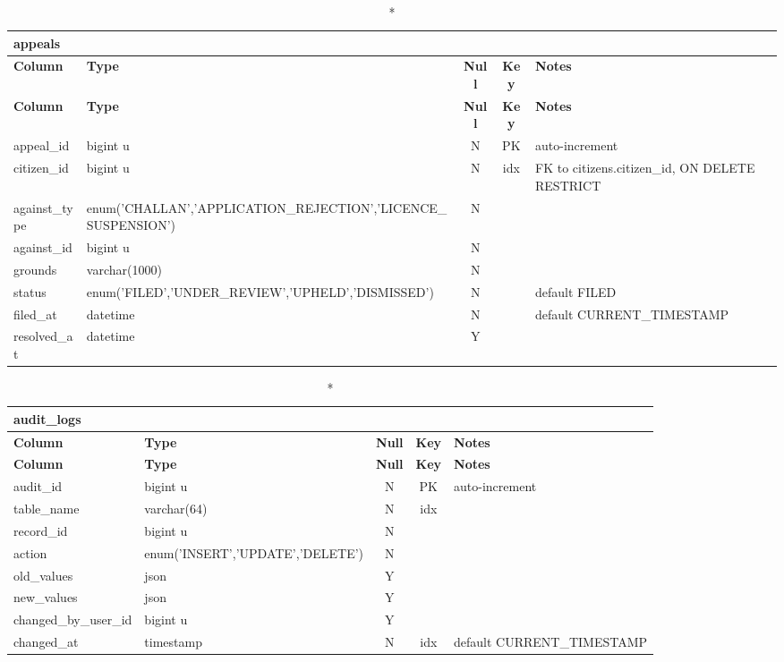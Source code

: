 \vspace{-0.4em}
\begin{longtable}{@{}p{3.4cm}p{2.9cm}c c p{5.6cm}@{}}
\caption*{\textbf{appeals}}\\
\toprule \textbf{Column} & \textbf{Type} & \textbf{Null} & \textbf{Key} & \textbf{Notes} \\ \midrule \endfirsthead
\toprule \textbf{Column} & \textbf{Type} & \textbf{Null} & \textbf{Key} & \textbf{Notes} \\ \midrule \endhead
\bottomrule \endlastfoot
appeal\_\allowbreak{}id & bigint u & N & PK & auto-increment \\
citizen\_\allowbreak{}id & bigint u & N & idx & FK to citizens.citizen\_\allowbreak{}id, ON DELETE RESTRICT \\
against\_\allowbreak{}type & enum('CHALLAN',\allowbreak{}'APPLICATION\_\allowbreak{}REJECTION',\allowbreak{}'LICENCE\_\allowbreak{}SUSPENSION') & N &  &  \\
against\_\allowbreak{}id & bigint u & N &  &  \\
grounds & varchar(1000) & N &  &  \\
status & enum('FILED',\allowbreak{}'UNDER\_\allowbreak{}REVIEW',\allowbreak{}'UPHELD',\allowbreak{}'DISMISSED') & N &  & default FILED \\
filed\_\allowbreak{}at & datetime & N &  & default CURRENT\_\allowbreak{}TIMESTAMP \\
resolved\_\allowbreak{}at & datetime & Y &  &  \\
\end{longtable}
\vspace{-0.4em}
\begin{longtable}{@{}p{3.4cm}p{2.9cm}c c p{5.6cm}@{}}
\caption*{\textbf{audit\_\allowbreak{}logs}}\\
\toprule \textbf{Column} & \textbf{Type} & \textbf{Null} & \textbf{Key} & \textbf{Notes} \\ \midrule \endfirsthead
\toprule \textbf{Column} & \textbf{Type} & \textbf{Null} & \textbf{Key} & \textbf{Notes} \\ \midrule \endhead
\bottomrule \endlastfoot
audit\_\allowbreak{}id & bigint u & N & PK & auto-increment \\
table\_\allowbreak{}name & varchar(64) & N & idx &  \\
record\_\allowbreak{}id & bigint u & N &  &  \\
action & enum('INSERT',\allowbreak{}'UPDATE',\allowbreak{}'DELETE') & N &  &  \\
old\_\allowbreak{}values & json & Y &  &  \\
new\_\allowbreak{}values & json & Y &  &  \\
changed\_\allowbreak{}by\_\allowbreak{}user\_\allowbreak{}id & bigint u & Y &  &  \\
changed\_\allowbreak{}at & timestamp & N & idx & default CURRENT\_\allowbreak{}TIMESTAMP \\
\end{longtable}
\vspace{-0.4em}